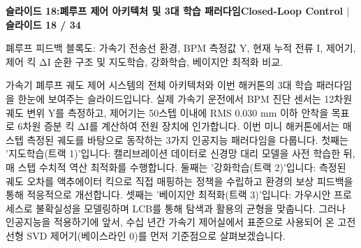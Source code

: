 \documentclass[11pt,a4paper]{article}
\begin{document}
\clearpage
\hypertarget{slide.18}{}
{}
\noindent\begin{tcolorbox}[colback=navy,colframe=navy,left=6pt,right=6pt,top=3pt,bottom=3pt,boxrule=0pt,arc=2pt]
{\large\bfseries\color{white}슬라이드 18:\enspace 폐루프 제어 아키텍처 및 3대 학습 패러다임}\hfill{\footnotesize\bfseries\color{white!85!lightbg}Closed-Loop Control \enspace$|$\enspace 슬라이드 18 / 34}
\end{tcolorbox}
\vspace{0.2em}
\begin{tcolorbox}[colback=lightbg,colframe=bordergray,title={\footnotesize\bfseries\color{darkgray}슬라이드 시각 구성 요약},fontupper=\small,left=6pt,right=6pt,top=2.5pt,bottom=2.5pt,boxrule=0.6pt,arc=2.5pt]
폐루프 피드백 블록도: 가속기 전송선 환경, BPM 측정값 Y, 현재 누적 전류 I, 제어기, 제어 킥 ΔI 순환 구조 및 지도학습, 강화학습, 베이지안 최적화 비교.
\end{tcolorbox}
\vspace{0.2em}
\begin{tcolorbox}[colback=white,colframe=primaryblue,title={\footnotesize\bfseries\color{white}발표자 구두 대본 (Spoken Script)},fontupper=\small,left=6pt,right=6pt,top=3pt,bottom=3pt,boxrule=0.8pt,arc=2.5pt]
가속기 폐루프 궤도 제어 시스템의 전체 아키텍처와 이번 해커톤의 3대 학습 패러다임을 한눈에 보여주는 슬라이드입니다. 실제 가속기 운전에서 BPM 진단 센서는 12차원 궤도 변위 Y를 측정하고, 제어기는 50스텝 이내에 RMS 0.030 mm 이하 안착을 목표로 6차원 증분 킥 ΔI를 계산하여 전원 장치에 인가합니다. 이번 미니 해커톤에서는 매 스텝 측정된 궤도를 바탕으로 동작하는 3가지 인공지능 패러다임을 다룹니다. 첫째는 '지도학습(트랙 1)'입니다: 캘리브레이션 데이터로 신경망 대리 모델을 사전 학습한 뒤, 매 스텝 수치적 역산 최적화를 수행합니다. 둘째는 '강화학습(트랙 2)'입니다: 측정된 궤도 오차를 액추에이터 킥으로 직접 매핑하는 정책을 수립하고 환경의 보상 피드백을 통해 적응적으로 개선합니다. 셋째는 '베이지안 최적화(트랙 3)'입니다: 가우시안 프로세스로 불확실성을 모델링하며 LCB를 통해 탐색과 활용의 균형을 맞춥니다. 그러나 인공지능을 적용하기에 앞서, 수십 년간 가속기 제어실에서 표준으로 사용되어 온 고전 선형 SVD 제어기(베이스라인 0)를 먼저 기준점으로 살펴보겠습니다.
\end{tcolorbox}
\vspace{0.2em}
\end{document}
